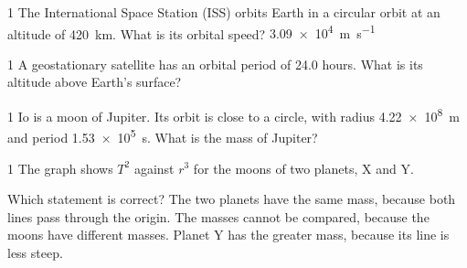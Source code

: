 \begin{practiceq}{1}{}
The International Space Station (ISS) orbits Earth in a circular orbit at an altitude of
\qty{420}{km}. What is its orbital speed?
  {\qty{3.09e4}{m.s^{-1}}}
\end{practiceq}

\begin{practiceq}{1}{}
A geostationary satellite has an orbital period of 24.0 hours. What is its altitude above Earth's
surface?
\end{practiceq}

\begin{practiceq}{1}{}
Io is a moon of Jupiter. Its orbit is close to a circle, with radius \qty{4.22e8}{m} and period
\qty{1.53e5}{s}. What is the mass of Jupiter?
\end{practiceq}

\begin{practiceq}{1}{}
The graph shows $T^2$ against $r^3$ for the moons of two planets, X and Y.
\begin{center}
\end{center}
Which statement is correct?
  {The two planets have the same mass, because both lines pass through the origin.}
  {The masses cannot be compared, because the moons have different masses.}
  {Planet Y has the greater mass, because its line is less steep.}
\end{practiceq}

